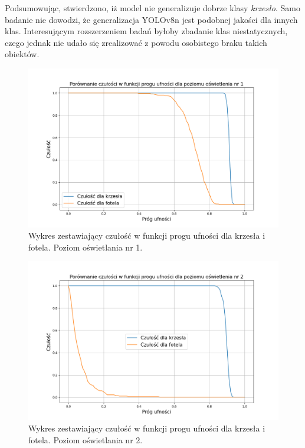 Podsumowując, stwierdzono, iż model nie generalizuje dobrze klasy \emph{krzesło}. Samo badanie nie dowodzi, że generalizacja YOLOv8n jest podobnej jakości dla innych klas. Interesującym rozszerzeniem badań byłoby zbadanie klas niestatycznych, czego jednak nie udało się zrealizować z powodu osobistego braku takich obiektów.

\begin{figure}[H]
    \centering
    \includegraphics[width=\linewidth]{r_test_dokładności/chair_charts/1.png}
    \caption{Wykres zestawiający czułość w funkcji progu ufności dla krzesła i fotela. Poziom oświetlania nr 1.}
    \label{fig:chair-game-1}
\end{figure}

\begin{figure}[H]
    \centering
    \includegraphics[width=\linewidth]{r_test_dokładności/chair_charts/2.png}
    \caption{Wykres zestawiający czułość w funkcji progu ufności dla krzesła i fotela. Poziom oświetlania nr 2.}
    \label{fig:chair-game-2}
\end{figure}

